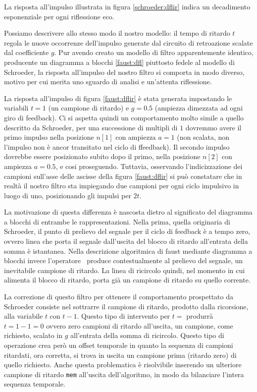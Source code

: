 \begin{refsection}
La risposta all'impulso illustrata in figura \ref{schroeder:dflir} indica un
decadimento esponenziale per ogni riflessione eco.

Possiamo descrivere allo stesso modo il nostro modello: il tempo di ritardo $t$
regola le nuove occorrenze dell'impulso generate dal circuito di retroazione
scalate dal coefficiente $g$. Pur avendo creato un modello di filtro
apparentemente identico, producente un diagramma a blocchi \ref{faust:dfl}
piuttosto fedele al modello di Schroeder, la risposta all'impulso del nostro
filtro si comporta in modo diverso, motivo per cui merita uno sguardo di analisi
e un'attenta riflessione.

La risposta all'impulso di figura \ref{faust:dflir} è stata generata impostando
le variabili $t=1$ (un campione di ritardo) e $g=0.5$ (ampiezza dimezzata ad
ogni giro di feedback). Ci si aspetta quindi un comportamento molto simile a
quello descritto da Schroeder, per una successione di multipli di $1$ dovremmo
avere il primo impulso nella posizione $n[1]$ con ampiezza $a=1$ (non scalata,
non l'impulso non è ancor transitato nel ciclo di ffeedback). Il secondo impulso
dovrebbe essere posizionato subito dopo il primo, nella posizione $n[2]$ con
ampiezza $a=0.5$, e cosi proseguendo. Tuttavia, osservando l'indicizzazione dei
campioni sull'asse delle ascisse della figura \ref{faust:dflir} si può constatare
che in realtà il nostro filtro sta impiegando due campioni per ogni ciclo
impulsivo in luogo di uno, posizionando gli impulsi per $2t$.

La motivazione di questa differenza è nascosta dietro al significato del diagramma
a blocchi di entrambe le rappresentazioni. Nella prima, quella originaria di Schroeder,
il punto di prelievo del segnale per il ciclo di feedback è a tempo zero, ovvero
linea che porta il segnale dall'uscita del blocco di ritardo all'entrata della
somma è istantanea. Nella descrizione algoritmica di faust mediante diagramma
a blocchi invece l'operatore $~$ produce contestualmente al prelievo del segnale,
un inevitabile campione di ritardo. La linea di ricircolo quindi, nel momento
in cui alimenta il blocco di ritardo, porta già un campione di ritardo su quello
corrente.

La correzione di questo filtro per ottenere il comportamento prospettato da Schroeder
consiste nel sottrarre il campione di ritardo, prodotto dalla ricorsione, alla
variabile $t$ con $t-1$. Questo tipo di intervento per $t=$ produrrà $t=1-1=0$
ovvero zero campioni di ritardo all'uscita, un campione, come richiesto,
scalato in $g$ all'entrata della somma di ricircolo. Questo tipo di operazione
crea però un offset temporale in quanto la sequenza di campioni ritardati, ora
corretta, si trova in uscita un campione prima (ritardo zero) di quello richiesto.
Anche questa problematica è risolvibile inserendo un ulteriore campione di ritardo
\texttt{mem} all'uscita dell'algoritmo, in modo da bilanciare l'intera sequenza
temporale.


\end{refsection}
